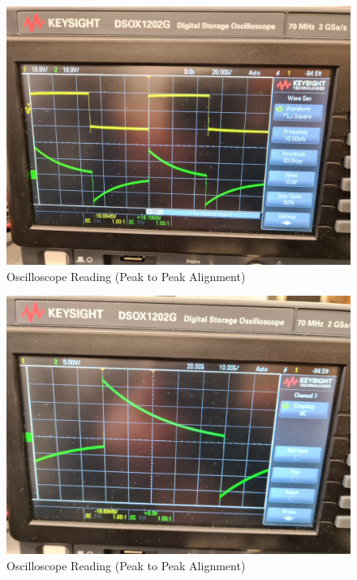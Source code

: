 \documentclass[a4paper,12pt]{article}
\begin{document}
\begin{figure}[H]
  \centering
  \includegraphics[width=1.0\linewidth]{../data/20211116_104029.jpg}    
  \begin{center}
    \begin{center}   
    \end{center}  \end{center}
  \caption{Oscilloscope Reading (Peak to Peak Alignment)}
  \label{osc}
\end{figure}

\begin{figure}[H]
  \centering
  \includegraphics[width=1.0\linewidth]{../data/20211116_104137.jpg}    
  \begin{center}
    \begin{center}   
    \end{center}  \end{center}
  \caption{Oscilloscope Reading (Peak to Peak Alignment)}
  \label{osc}
\end{figure}
\end{document}
